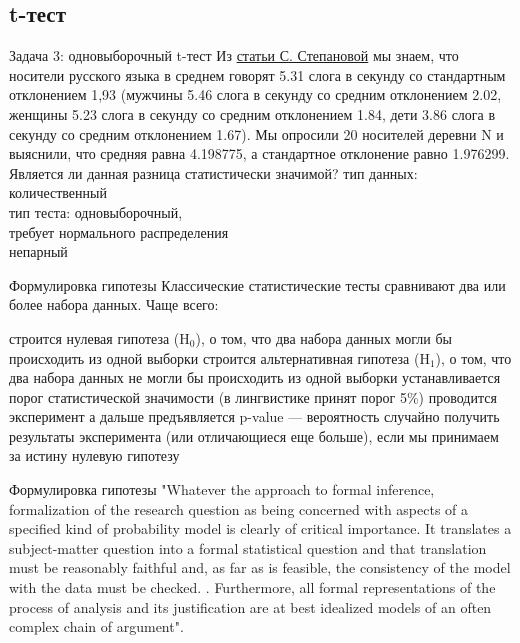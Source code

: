 \subsection{t-тест}
\begin{frame}{Задача 3: одновыборочный t-тест}
Из \href{https://www.internationalphoneticassociation.org/icphs-proceedings/ICPhS2011/OnlineProceedings/RegularSession/Stepanova/Stepanova.pdf}{\alert{статьи С. Степановой}} мы знаем, что носители русского языка в среднем говорят 5.31 слога в секунду со стандартным отклонением 1,93 (мужчины 5.46 слога в секунду  со средним отклонением 2.02, женщины 5.23 слога в секунду  со средним отклонением 1.84, дети 3.86 слога в секунду со средним отклонением 1.67). Мы опросили 20 носителей деревни N и выяснили, что средняя равна 4.198775, а стандартное отклонение равно 1.976299. Является ли данная разница статистически значимой?
\vfill
тип данных: количественный\\
тип теста: одновыборочный,\\
требует нормального распределения\\
непарный
\end{frame}
\begin{frame}{Формулировка гипотезы}
Классические статистические тесты сравнивают два или более набора данных. Чаще всего:
\begin{itemize}
\mytem  строится нулевая гипотеза (H$_0$), о том, что два набора данных могли бы происходить из одной выборки
\mytem строится альтернативная гипотеза (H$_1$), о том, что два набора данных не могли бы происходить из одной выборки
\mytem устанавливается порог статистической значимости (в лингвистике принят порог 5\%)
\mytem проводится эксперимент
\mytem а дальше предъявляется p-value — вероятность случайно получить результаты эксперимента (или отличающиеся еще больше),  если мы принимаем за истину нулевую гипотезу
\end{itemize}
\end{frame}
\begin{frame}{Формулировка гипотезы}
"Whatever the approach to formal inference, formalization of the research question as being concerned with aspects of a specified kind of probability model is clearly of critical importance. It translates a subject-matter question into a formal statistical question and that translation must be reasonably faithful and, as far as is feasible, the consistency of the model with the data must be checked. {}. Furthermore, all formal representations of the process of analysis and its justification are at best idealized models of an often complex chain of argument". \\
\hfill \cite[197]{cox06}
\end{frame}
